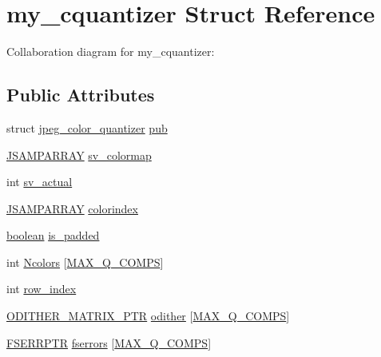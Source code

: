 \hypertarget{structmy__cquantizer}{}\section{my\+\_\+cquantizer Struct Reference}
\label{structmy__cquantizer}


Collaboration diagram for my\+\_\+cquantizer\+:
\subsection*{Public Attributes}
\begin{DoxyCompactItemize}
\item 
struct \mbox{\hyperlink{structjpeg__color__quantizer}{jpeg\+\_\+color\+\_\+quantizer}} \mbox{\hyperlink{structmy__cquantizer_a81f2eb75e01985369a162d52f5086409}{pub}}
\item 
\mbox{\hyperlink{jpeglib_8h_ac9d5d1b829ed51769db69a37271a7e91}{J\+S\+A\+M\+P\+A\+R\+R\+AY}} \mbox{\hyperlink{structmy__cquantizer_a9d0cd4d81691db3ec5f01e68fe6537bd}{sv\+\_\+colormap}}
\item 
int \mbox{\hyperlink{structmy__cquantizer_a9fcddbecf01942c4976e271de23effd5}{sv\+\_\+actual}}
\item 
\mbox{\hyperlink{jpeglib_8h_ac9d5d1b829ed51769db69a37271a7e91}{J\+S\+A\+M\+P\+A\+R\+R\+AY}} \mbox{\hyperlink{structmy__cquantizer_a7ec499ccdb9c6983c14edc40453ac1ed}{colorindex}}
\item 
\mbox{\hyperlink{jmorecfg_8h_a7c6368b321bd9acd0149b030bb8275ed}{boolean}} \mbox{\hyperlink{structmy__cquantizer_abd8e895b22508f002cab06b54c4ee64c}{is\+\_\+padded}}
\item 
int \mbox{\hyperlink{structmy__cquantizer_a6b3c0905a888bd09ee2b8561ad8524c8}{Ncolors}} \mbox{[}\mbox{\hyperlink{jquant1_8c_aab2c575f4e3d73fa8e03c145e00459df}{M\+A\+X\+\_\+\+Q\+\_\+\+C\+O\+M\+PS}}\mbox{]}
\item 
int \mbox{\hyperlink{structmy__cquantizer_a0f10920c096845b912925a98019afc62}{row\+\_\+index}}
\item 
\mbox{\hyperlink{jquant1_8c_adf00bce01b4be95b97238b73f71a24ea}{O\+D\+I\+T\+H\+E\+R\+\_\+\+M\+A\+T\+R\+I\+X\+\_\+\+P\+TR}} \mbox{\hyperlink{structmy__cquantizer_aaa7e366ab4998e891762cc56f4ada754}{odither}} \mbox{[}\mbox{\hyperlink{jquant1_8c_aab2c575f4e3d73fa8e03c145e00459df}{M\+A\+X\+\_\+\+Q\+\_\+\+C\+O\+M\+PS}}\mbox{]}
\item 
\mbox{\hyperlink{jquant1_8c_a930ab0c20ada7242a123ab0f60de3c77}{F\+S\+E\+R\+R\+P\+TR}} \mbox{\hyperlink{structmy__cquantizer_a486b351b769e8cdfc832dc33309c7069}{fserrors}} \mbox{[}\mbox{\hyperlink{jquant1_8c_aab2c575f4e3d73fa8e03c145e00459df}{M\+A\+X\+\_\+\+Q\+\_\+\+C\+O\+M\+PS}}\mbox{]}

\end{DoxyCompactItemize}
